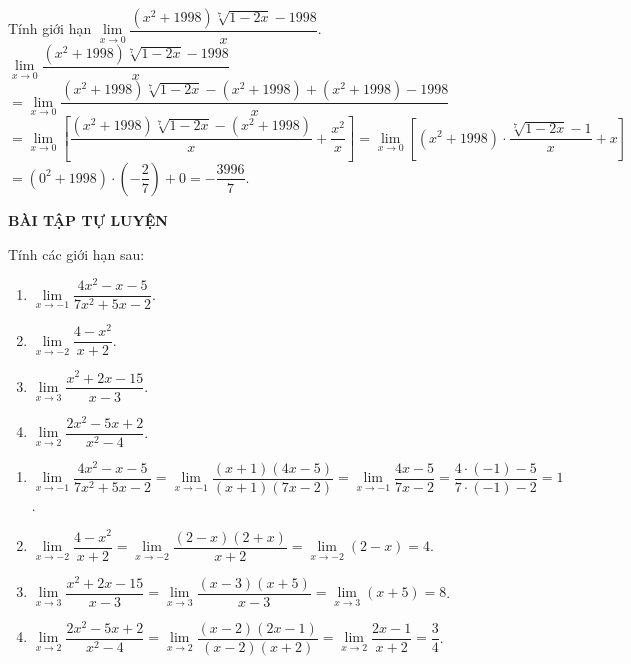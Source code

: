 \begin{vd}%
Tính giới hạn $\lim\limits_{x\to 0}\dfrac{(x^2+1998)\sqrt[7]{1-2x}-1998}{x}$.
\loigiai
{
$\lim\limits_{x\to 0}\dfrac{(x^2+1998)\sqrt[7]{1-2x}-1998}{x}$\\
$= \lim\limits_{x\to 0}\dfrac{(x^2+1998)\sqrt[7]{1-2x}-(x^2+1998)+(x^2+1998)-1998}{x}$\\
$= \lim\limits_{x\to 0}\left[\dfrac{(x^2+1998)\sqrt[7]{1-2x}-(x^2+1998)}{x}+\dfrac{x^2}{x}\right] = \lim\limits_{x\to 0}\left[(x^2+1998) \cdot \dfrac{\sqrt[7]{1-2x}-1}{x}+x\right]$\\
$= (0^2+1998) \cdot \left(-\dfrac{2}{7}\right)+0=-\dfrac{3996}{7}$.
}
\end{vd}


\begin{center}
\textbf{BÀI TẬP TỰ LUYỆN}
\end{center}

\begin{bt}%
Tính các giới hạn sau:
\begin{multicols}{2}
\begin{enumerate}
\item $\lim\limits_{x \to -1}\dfrac{4x^2-x-5}{7x^2+5x-2}$.
\item $\lim\limits_{x \to -2}\dfrac{4-x^2}{x+2}$.
\item $\lim\limits_{x \to 3}\dfrac{x^2+2x-15}{x-3}$.
\item $\lim\limits_{x \to 2}\dfrac{2x^2-5x+2}{x^2-4}$.
\end{enumerate}
\end{multicols}
\loigiai
{
\begin{enumerate}
\item $\lim\limits_{x \to -1}\dfrac{4x^2-x-5}{7x^2+5x-2} = \lim\limits_{x\to -1}\dfrac{(x+1)(4x-5)}{(x+1)(7x-2)} = \lim\limits_{x\to -1}\dfrac{4x-5}{7x-2} = \dfrac{4 \cdot (-1)-5}{7 \cdot (-1)-2} = 1$.

\item $\lim\limits_{x \to -2}\dfrac{4-x^2}{x+2} = \lim\limits_{x \to -2} \dfrac{(2-x)(2+x)}{x+2} = \lim\limits_{x \to -2} (2-x) = 4$.

\item $\lim\limits_{x \to 3}\dfrac{x^2+2x-15}{x-3} = \lim\limits_{x \to 3} \dfrac{(x-3)(x+5)}{x-3} = \lim\limits_{x \to 3} (x + 5) = 8$.

\item $\lim\limits_{x \to 2}\dfrac{2x^2-5x+2}{x^2-4} = \lim\limits_{x \to 2}\dfrac{(x-2)(2x-1)}{(x-2)(x+2)} = \lim\limits_{x \to 2}\dfrac{2x-1}{x+2} = \dfrac{3}{4}$.

\end{enumerate}
}
\end{bt}


